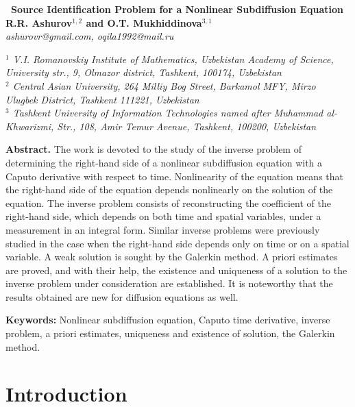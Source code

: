\documentclass[12pt]{amsart}
\theoremstyle{definition}
\numberwithin{equation}{section}
\begin{document}
\begin{center}
\textbf{{\large {\ 
Source Identification Problem for a Nonlinear Subdiffusion Equation}}}\\[0pt]
\medskip \textbf{R.R. Ashurov$^{1,2}$ and O.T. Mukhiddinova$^{3,1}$}\\[0pt]
\textit{ashurovr@gmail.com, oqila1992@mail.ru \\[0pt]}


\smallskip

\textit{$^{1}$ V.I. Romanovskiy Institute of Mathematics, Uzbekistan Academy of Science, University str., 9, Olmazor district, Tashkent, 100174, Uzbekistan} \\

\textit{$^{2}$ Central Asian University, 264 Milliy Bog Street, Barkamol MFY, Mirzo Ulugbek District, Tashkent 111221, Uzbekistan} \\

\textit{$^{3}$ Tashkent University of Information Technologies named after Muhammad al-Khwarizmi, Str., 108, Amir Temur Avenue, Tashkent, 100200, Uzbekistan}

\end{center}

\textbf{Abstract.}
The work is devoted to the study of the inverse problem of determining the right-hand side of a nonlinear subdiffusion equation with a Caputo derivative with respect to time. Nonlinearity of the equation means that the right-hand side of the equation depends nonlinearly on the solution of the equation. The inverse problem consists of reconstructing the coefficient of the right-hand side, which depends on both time and spatial variables, under a measurement in an integral form. Similar inverse problems were previously studied in the case when the right-hand side depends only on time or on a spatial variable. A weak solution is sought by the Galerkin method. A priori estimates are proved, and with their help, the existence and uniqueness of a solution to the inverse problem under consideration are established. It is noteworthy that the results obtained are new for diffusion equations as well.

\textbf{Keywords:}
Nonlinear subdiffusion equation, Caputo time derivative, inverse problem, a priori estimates, uniqueness and existence of solution, the Galerkin method.

\section{Introduction}
\end{document}

